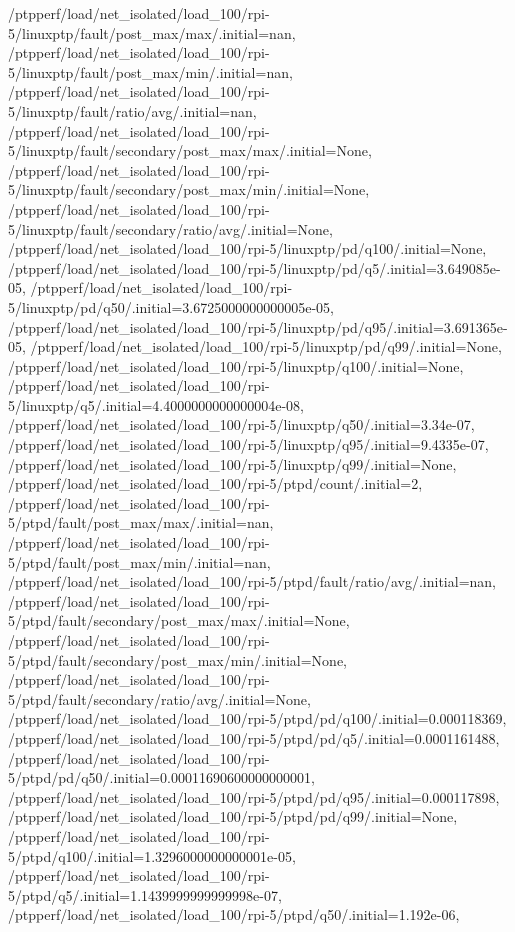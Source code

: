 {    /ptpperf/load/net_isolated/load_100/rpi-5/linuxptp/fault/post_max/max/.initial=nan,
    /ptpperf/load/net_isolated/load_100/rpi-5/linuxptp/fault/post_max/min/.initial=nan,
    /ptpperf/load/net_isolated/load_100/rpi-5/linuxptp/fault/ratio/avg/.initial=nan,
    /ptpperf/load/net_isolated/load_100/rpi-5/linuxptp/fault/secondary/post_max/max/.initial=None,
    /ptpperf/load/net_isolated/load_100/rpi-5/linuxptp/fault/secondary/post_max/min/.initial=None,
    /ptpperf/load/net_isolated/load_100/rpi-5/linuxptp/fault/secondary/ratio/avg/.initial=None,
    /ptpperf/load/net_isolated/load_100/rpi-5/linuxptp/pd/q100/.initial=None,
    /ptpperf/load/net_isolated/load_100/rpi-5/linuxptp/pd/q5/.initial=3.649085e-05,
    /ptpperf/load/net_isolated/load_100/rpi-5/linuxptp/pd/q50/.initial=3.6725000000000005e-05,
    /ptpperf/load/net_isolated/load_100/rpi-5/linuxptp/pd/q95/.initial=3.691365e-05,
    /ptpperf/load/net_isolated/load_100/rpi-5/linuxptp/pd/q99/.initial=None,
    /ptpperf/load/net_isolated/load_100/rpi-5/linuxptp/q100/.initial=None,
    /ptpperf/load/net_isolated/load_100/rpi-5/linuxptp/q5/.initial=4.4000000000000004e-08,
    /ptpperf/load/net_isolated/load_100/rpi-5/linuxptp/q50/.initial=3.34e-07,
    /ptpperf/load/net_isolated/load_100/rpi-5/linuxptp/q95/.initial=9.4335e-07,
    /ptpperf/load/net_isolated/load_100/rpi-5/linuxptp/q99/.initial=None,
    /ptpperf/load/net_isolated/load_100/rpi-5/ptpd/count/.initial=2,
    /ptpperf/load/net_isolated/load_100/rpi-5/ptpd/fault/post_max/max/.initial=nan,
    /ptpperf/load/net_isolated/load_100/rpi-5/ptpd/fault/post_max/min/.initial=nan,
    /ptpperf/load/net_isolated/load_100/rpi-5/ptpd/fault/ratio/avg/.initial=nan,
    /ptpperf/load/net_isolated/load_100/rpi-5/ptpd/fault/secondary/post_max/max/.initial=None,
    /ptpperf/load/net_isolated/load_100/rpi-5/ptpd/fault/secondary/post_max/min/.initial=None,
    /ptpperf/load/net_isolated/load_100/rpi-5/ptpd/fault/secondary/ratio/avg/.initial=None,
    /ptpperf/load/net_isolated/load_100/rpi-5/ptpd/pd/q100/.initial=0.000118369,
    /ptpperf/load/net_isolated/load_100/rpi-5/ptpd/pd/q5/.initial=0.0001161488,
    /ptpperf/load/net_isolated/load_100/rpi-5/ptpd/pd/q50/.initial=0.00011690600000000001,
    /ptpperf/load/net_isolated/load_100/rpi-5/ptpd/pd/q95/.initial=0.000117898,
    /ptpperf/load/net_isolated/load_100/rpi-5/ptpd/pd/q99/.initial=None,
    /ptpperf/load/net_isolated/load_100/rpi-5/ptpd/q100/.initial=1.3296000000000001e-05,
    /ptpperf/load/net_isolated/load_100/rpi-5/ptpd/q5/.initial=1.1439999999999998e-07,
    /ptpperf/load/net_isolated/load_100/rpi-5/ptpd/q50/.initial=1.192e-06,
}
